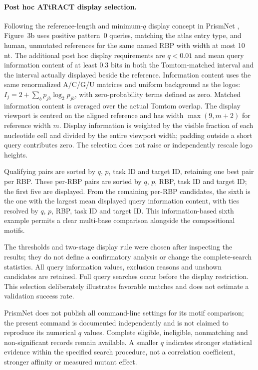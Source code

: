 \documentclass[11pt]{article}
\begin{document}
\paragraph{Post hoc ATtRACT display selection.} Following the reference-length and minimum-$q$ display concept in PrismNet \citep{sun2021prismnet}, Figure~3b uses positive pattern~0 queries, matching the atlas entry type, and human, unmutated references for the same named RBP with width at most 10 nt. The additional post hoc display requirements are $q<0.01$ and mean query information content of at least 0.3 bits in both the Tomtom-matched interval and the interval actually displayed beside the reference. Information content uses the same renormalized A/C/G/U matrices and uniform background as the logos: $I_j=2+\sum_b p_{jb}\log_2p_{jb}$, with zero-probability terms defined as zero. Matched information content is averaged over the actual Tomtom overlap. The display viewport is centred on the aligned reference and has width $\max(9,m+2)$ for reference width $m$. Display information is weighted by the visible fraction of each nucleotide cell and divided by the entire viewport width; padding outside a short query contributes zero. The selection does not raise or independently rescale logo heights.

Qualifying pairs are sorted by $q$, $p$, task ID and target ID, retaining one best pair per RBP. These per-RBP pairs are sorted by $q$, $p$, RBP, task ID and target ID; the first five are displayed. From the remaining per-RBP candidates, the sixth is the one with the largest mean displayed query information content, with ties resolved by $q$, $p$, RBP, task ID and target ID. This information-based sixth example permits a clear multi-base comparison alongside the compositional motifs.

The thresholds and two-stage display rule were chosen after inspecting the results; they do not define a confirmatory analysis or change the complete-search statistics. All query information values, exclusion reasons and unshown candidates are retained. Full query searches occur before the display restriction. This selection deliberately illustrates favorable matches and does not estimate a validation success rate.

PrismNet does not publish all command-line settings for its motif comparison; the present command is documented independently and is not claimed to reproduce its numerical $q$ values. Complete eligible, ineligible, nonmatching and non-significant records remain available. A smaller $q$ indicates stronger statistical evidence within the specified search procedure, not a correlation coefficient, stronger affinity or measured mutant effect.
\end{document}

